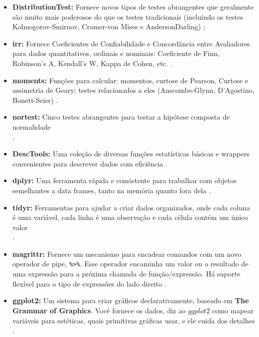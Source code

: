 \documentclass[a4paper,11pt]{article} %
\begin{document}
\begin{itemize}
    \item \textbf{DistributionTest:} Fornece novos tipos de testes abrangentes que geralmente são muito mais poderosos do que os testes tradicionais (incluindo os testes Kolmogorov-Smirnov, Cramer-von Mises e AndersonDarling) \cite{DistributionTest};

    \item \textbf{irr:} Fornece Coeficientes de Confiabilidade e Concordância entre Avaliadores para dados quantitativos, ordinais e nominais: Coeficiente de Finn, Robinson's A, Kendall's W, Kappa de Cohen, etc. \cite{irr}.

    \item \textbf{moments:} Funções para calcular: momentos, curtose de Pearson, Curtose e assimetria de Geary; testes relacionados a eles (Anscombe-Glynn, D'Agostino, Bonett-Seier) \cite{moments}.

    \item  \textbf{nortest:} Cinco testes abrangentes para testar a hipótese composta de normalidade \\ \cite{nortest}.

    \item \textbf{DescTools:} Uma coleção de diversas funções estatísticas básicas e wrappers convenientes para descrever dados com eficiência \cite{DescTools}.

    \item \textbf{dplyr:} Uma ferramenta rápida e consistente para trabalhar com objetos semelhantes a data frames, tanto na memória quanto fora dela \cite{dplyr}.

    \item \textbf{tidyr:} Ferramentas para ajudar a criar dados organizados, onde cada coluna é uma variável, cada linha é uma observação e cada célula contém um único valor \\ \cite{tidyr}.

    \item \textbf{magrittr:} Fornece um mecanismo para encadear comandos com um novo operador de pipe, \texttt{\%>\%}. Esse operador encaminha um valor ou o resultado de uma expressão para a próxima chamada de função/expressão. Há suporte flexível para o tipo de expressões do lado direito \cite{magrittr}.

    \item \textbf{ggplot2:} Um sistema para criar gráficos declarativamente, baseado em \textbf{The Grammar of Graphics}. Você fornece os dados, diz ao $ggplot2$ como mapear variáveis para estéticas, quais primitivas gráficas usar, e ele cuida dos detalhes \cite{ggplot2}.
\end{itemize}
\end{document}
